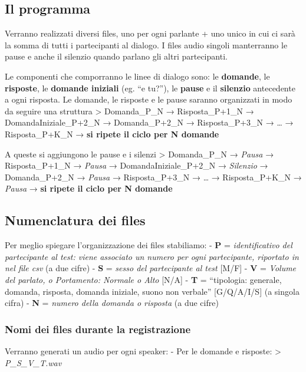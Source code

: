 \documentclass[
]{article}
\begin{document}
\subsection{Il programma}\label{il-programma}

Verranno realizzati diversi files, uno per ogni parlante + uno unico in cui ci sarà la somma di tutti i partecipanti al dialogo. I files audio singoli manterranno le pause e anche il silenzio quando parlano gli altri partecipanti.

Le componenti che comporranno le linee di dialogo sono: le \textbf{domande}, le \textbf{risposte}, le \textbf{domande iniziali} (eg. ``e tu?''), le \textbf{pause} e il \textbf{silenzio} antecedente a ogni risposta. Le domande, le risposte e le pause saranno organizzati in modo da seguire una struttura \textgreater{} Domanda\_P\_N → Risposta\_P+1\_N → DomandaIniziale\_P+2\_N → Domanda\_P+2\_N → Risposta\_P+3\_N → \ldots{} → Risposta\_P+K\_N → \textbf{si ripete il ciclo per N domande}

A queste si aggiungono le pause e i silenzi \textgreater{} Domanda\_P\_N → \emph{Pausa} → Risposta\_P+1\_N → \emph{Pausa} → DomandaIniziale\_P+2\_N → \emph{Silenzio} → Domanda\_P+2\_N → \emph{Pausa} → Risposta\_P+3\_N → \ldots{} → Risposta\_P+K\_N → \emph{Pausa} → \textbf{si ripete il ciclo per N domande}

\subsection{Numenclatura dei files}\label{numenclatura-dei-files}

Per meglio spiegare l'organizzazione dei files stabiliamo: - \textbf{P} = \emph{identificativo del partecipante al test: viene associato un numero per ogni partecipante, riportato in nel file csv} (a due cifre) - \textbf{S} = \emph{sesso del partecipante al test} {[}M/F{]} - \textbf{V} = \emph{Volume del parlato, o Portamento: Normale o Alto} {[}N/A{]} - \textbf{T} = ``tipologia: generale, domanda, risposta, domanda iniziale, suono non verbale'' {[}G/Q/A/I/S{]} (a singola cifra) - \textbf{N} = \emph{numero della domanda o risposta} (a due cifre)

\subsubsection{Nomi dei files durante la registrazione}\label{nomi-dei-files-durante-la-registrazione}

Verranno generati un audio per ogni speaker: - Per le domande e risposte: \textgreater{} \emph{P\_S\_V\_T.wav}
\end{document}
